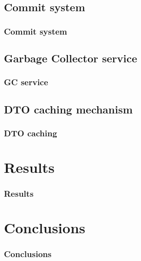 \documentclass{beamer}
\begin{document}
\subsection{Commit system}
\begin{frame}
\frametitle{Commit system}
\end{frame}

\subsection{Garbage Collector service}
\begin{frame}
\frametitle{GC service}
\end{frame}

\subsection{DTO caching mechanism}
\begin{frame}
\frametitle{DTO caching}
\end{frame}

\section{Results}
\begin{frame}
\frametitle{Results}
\end{frame}

\section{Conclusions}
\begin{frame}
\frametitle{Conclusions}
\end{frame}
\end{document}
